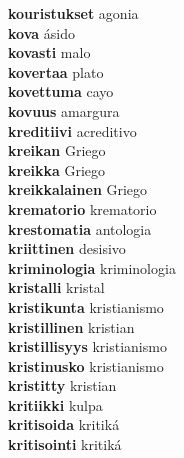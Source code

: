 \textbf{kouristukset } agonia \\
\textbf{kova } ásido \\
\textbf{kovasti } malo \\
\textbf{kovertaa } plato \\
\textbf{kovettuma } cayo \\
\textbf{kovuus } amargura \\
\textbf{kreditiivi } acreditivo \\
\textbf{kreikan } Griego \\
\textbf{kreikka } Griego \\
\textbf{kreikkalainen } Griego \\
\textbf{krematorio } krematorio \\
\textbf{krestomatia } antologia \\
\textbf{kriittinen } desisivo \\
\textbf{kriminologia } kriminologia \\
\textbf{kristalli } kristal \\
\textbf{kristikunta } kristianismo \\
\textbf{kristillinen } kristian \\
\textbf{kristillisyys } kristianismo \\
\textbf{kristinusko } kristianismo \\
\textbf{kristitty } kristian \\
\textbf{kritiikki } kulpa \\
\textbf{kritisoida } kritiká \\
\textbf{kritisointi } kritiká \\
